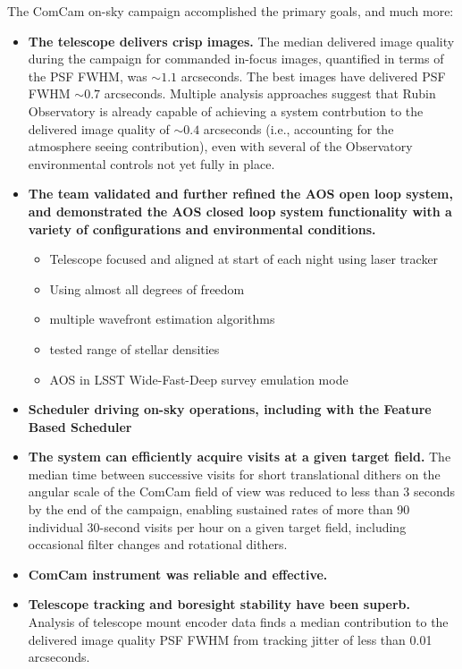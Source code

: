 The ComCam on-sky campaign accomplished the primary goals, and much more:

\begin{itemize}
    \item \textbf{The telescope delivers crisp images.}
    The median delivered image quality during the campaign for commanded in-focus images, quantified in terms of the PSF FWHM, was $\sim1.1$ arcseconds.
    The best images have delivered PSF FWHM $\sim0.7$ arcseconds.
    Multiple analysis approaches suggest that Rubin Observatory is already capable of achieving a system contrbution to the delivered image quality of $\sim0.4$ arcseconds (i.e., accounting for the atmosphere seeing contribution), even with several of the Observatory environmental controls not yet fully in place.
    \item \textbf{The team validated and further refined the AOS open loop system, and demonstrated the AOS closed loop system functionality with a variety of configurations and environmental conditions.}
    \begin{itemize}
        \item Telescope focused and aligned at start of each night using laser tracker
        \item Using almost all degrees of freedom
        \item multiple wavefront estimation algorithms
        \item tested range of stellar densities
        \item AOS in LSST Wide-Fast-Deep survey emulation mode
    \end{itemize}
    \item \textbf{Scheduler driving on-sky operations, including with the Feature Based Scheduler}
    \item \textbf{The system can efficiently acquire visits at a given target field.} The median time between successive visits for short translational dithers on the angular scale of the ComCam field of view was reduced to less than 3 seconds by the end of the campaign, enabling sustained rates of more than 90 individual 30-second visits per hour on a given target field, including occasional filter changes and rotational dithers.
    \item \textbf{ComCam instrument was reliable and effective.}
    \item \textbf{Telescope tracking and boresight stability have been superb.} Analysis of telescope mount encoder data finds a median contribution to the delivered image quality PSF FWHM from tracking jitter of less than 0.01 arcseconds.

\end{itemize}
